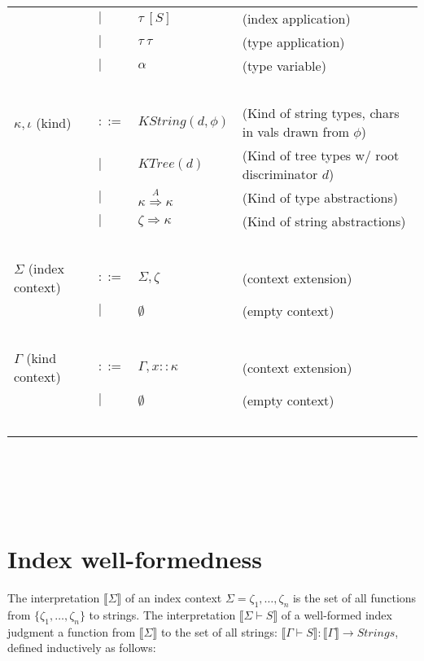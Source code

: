 \documentclass{article}
\newcommand{\sem}[1]{\llbracket #1 \rrbracket}
\begin{document}
\begin{tabular}{llll}
       & $\mid$ & $\tau~[S]$ & (index application) \\
       & $\mid$ & $\tau~\tau$ & (type application) \\
       & $\mid$ & $\alpha$ & (type variable) \\~\\
$\kappa, \iota$ (kind) & $::=$ & $\mathit{KString}(d,\phi)$ & (Kind of string types, chars in vals drawn from $\phi$) \\
                         & $\mid$ & $\mathit{KTree}(d)$ & (Kind of tree types w/ root discriminator $d$) \\
                         & $\mid$ & $\kappa \overset{A}{\Rightarrow} \kappa$ & (Kind of type abstractions) \\
                         & $\mid$ & $\zeta \Rightarrow \kappa$ & (Kind of string abstractions) \\~\\
$\Sigma$ (index context) & $::=$ & $\Sigma,\zeta$ & (context extension) \\
                         & $\mid$ & $\emptyset$ & (empty context) \\~\\
$\Gamma$ (kind context) & $::=$ & $\Gamma,x :: \kappa$ & (context extension) \\
                           & $\mid$ & $\emptyset$ & (empty context) \\~\\

\end{tabular}\\~\\~\\
\begin{tabular}{llll}

\end{tabular}

\section*{Index well-formedness}

The interpretation $\sem{\Sigma}$ of an index context $\Sigma = \zeta_1, \ldots, \zeta_n$ is the set of all functions from $\{ \zeta_1, \ldots, \zeta_n \}$ to strings. The interpretation $\sem{\Sigma \vdash S}$ of a well-formed index judgment a function from $\sem{\Sigma}$ to the set of all strings: $\sem{\Gamma \vdash S} : \sem{\Gamma} \to \mathit{Strings}$, defined inductively as follows:
\end{document}
